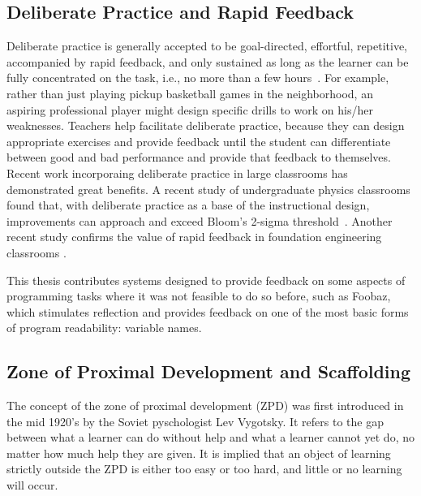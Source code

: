 \subsection{Deliberate Practice and Rapid Feedback}


Deliberate practice is generally accepted to be goal-directed, effortful, repetitive, accompanied by rapid feedback, and only sustained as long as the learner can be fully concentrated on the task, i.e., no more than a few hours~\cite{Gobet2012}. For example, rather than just playing pickup basketball games in the neighborhood, an aspiring professional player might design specific drills to work on his/her weaknesses. Teachers help facilitate deliberate practice, because they can design appropriate exercises and provide feedback until the student can differentiate between good and bad performance and provide that feedback to themselves. Recent work incorporaing deliberate practice in large classrooms has demonstrated great benefits. A recent study of undergraduate physics classrooms found that, with deliberate practice as a base of the instructional design, improvements can approach and exceed Bloom's 2-sigma threshold~\cite{Deslauriers862}. Another recent study confirms the value of rapid feedback in foundation engineering classrooms \cite{ieeeRapidFeedback}. 

This thesis contributes systems designed to provide feedback on some aspects of programming tasks where it was not feasible to do so before, such as Foobaz, which stimulates reflection and provides feedback on one of the most basic forms of program readability: variable names.

\subsection{Zone of Proximal Development and Scaffolding}

The concept of the zone of proximal development (ZPD) was first introduced in the mid 1920's by the Soviet pyschologist Lev Vygotsky. It refers to the gap between what a learner can do without help and what a learner cannot yet do, no matter how much help they are given. It is implied that an object of learning strictly outside the ZPD is either too easy or too hard, and little or no learning will occur.

